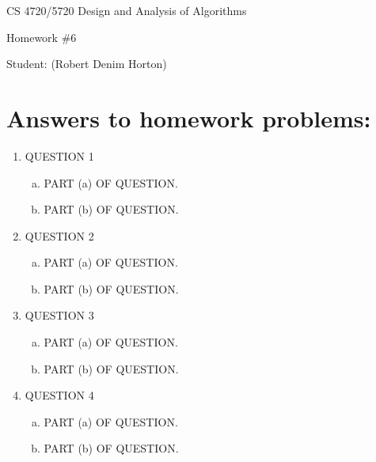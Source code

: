 \documentclass[11pt]{article}
\begin{document}
 

\rhead{\today}

\begin{center}\begin{Large}
CS 4720/5720 Design and Analysis of Algorithms

Homework \#6

Student: (Robert Denim Horton)
\end{Large}
\end{center}


\section*{Answers to homework problems:}

\begin{enumerate}
	\item QUESTION 1
		\begin{enumerate}[(a)]
			\item PART (a) OF QUESTION.
			\item PART (b) OF QUESTION.
		\end{enumerate}
	
	\item QUESTION 2
		\begin{enumerate}[(a)]
			\item PART (a) OF QUESTION.
			\item PART (b) OF QUESTION.
		\end{enumerate}
	
	\item QUESTION 3
		\begin{enumerate}[(a)]
			\item PART (a) OF QUESTION.
			\item PART (b) OF QUESTION.
		\end{enumerate}
	
	\item QUESTION 4
		\begin{enumerate}[(a)]
			\item PART (a) OF QUESTION.
			\item PART (b) OF QUESTION.
		\end{enumerate}
	\end{enumerate}
	
\end{document}
